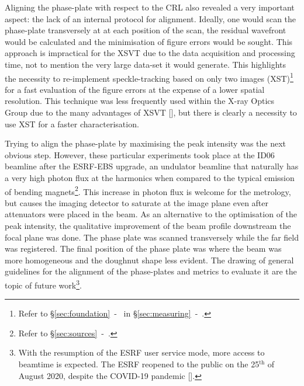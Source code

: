 \begin{refsection}
Aligning the phase-plate with respect to the CRL also revealed a very important aspect: the lack of an internal protocol for alignment. Ideally, one would scan the phase-plate transversely at at each position of the scan, the residual wavefront would be calculated and the minimisation of figure errors would be sought. This approach is impractical for the XSVT due to the data acquisition and processing time, not to mention the very large data-set it would generate. This highlights the necessity to re-implement speckle-tracking based on only two images (XST)\footnote{Refer to \S\ref{sec:foundation}~-~\textit{} in \S\ref{sec:measuring}~-~\textit{}.} for a fast evaluation of the figure errors at the expense of a lower spatial resolution. This technique was less frequently used within the X-ray Optics Group due to the many advantages of XSVT [\cite{Berujon2020}], but there is clearly a necessity to use XST for a faster characterisation.

Trying to align the phase-plate by maximising the peak intensity was the next obvious step. However, these particular experiments took place at the ID06 beamline after the ESRF-EBS upgrade, an undulator beamline that naturally has a very high photon flux at the harmonics when compared to the typical emission of bending magnets\footnote{Refer to \S\ref{sec:sources}~-~\textit{}.}. This increase in photon flux is welcome for the metrology, but causes the imaging detector to saturate at the image plane even after attenuators were placed in the beam. As an alternative to the optimisation of the peak intensity, the qualitative improvement of the beam profile downstream the focal plane was done. The phase plate was scanned transversely while the far field was registered. The final position of the phase plate was where the beam was more homogeneous and the doughnut shape less evident. The drawing of general guidelines for the alignment of the phase-plates and metrics to evaluate it are the topic of future work\footnote{With the resumption of the ESRF user service mode, more access to beamtime is expected. The ESRF reopened to the public on the 25$^\text{th}$ of August 2020, despite the COVID-19 pandemic [\cite{Cho2020}].}.


\end{refsection}
